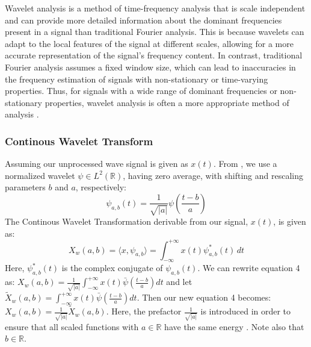 \documentclass{article}
\begin{document}
Wavelet analysis is a method of time-frequency analysis that is scale independent and can provide more detailed information about the dominant frequencies present in a signal than traditional Fourier analysis. This is because wavelets can adapt to the local features of the signal at different scales, allowing for a more accurate representation of the signal's frequency content. In contrast, traditional Fourier analysis assumes a fixed window size, which can lead to inaccuracies in the frequency estimation of signals with non-stationary or time-varying properties. Thus, for signals with a wide range of dominant frequencies or non-stationary properties, wavelet analysis is often a more appropriate method of analysis \cite{APracticalGuidetoWaveletAnalysis}.

\subsubsection{Continous Wavelet Transform}
Assuming our unprocessed wave signal is given as $x(t)$. From \cite{mertins1999signal}\cite{pereyra2012harmonic}, we use a normalized wavelet $\psi \in L^2(\mathbb{R})$, having zero average, with shifting and rescaling parameters $b$ and $a$, respectively:
\begin{equation} 
\psi_{a,b}(t) = \frac{1}{\sqrt{|a|}} \psi\left(\frac{t-b}{a}\right)
\end{equation}
The Continous Wavelet Transformation derivable from our signal, $x(t)$, is given as:
\begin{equation} 
X_{w}(a,b) = \langle x, \psi_{a,b} \rangle =\int_{-\infty}^{+\infty} x(t) \psi_{a,b}^{*}(t) \, dt
\end{equation}
Here, $\psi_{a,b}^{*}(t)$ is the complex conjugate of $\psi_{a,b}(t)$. We can rewrite equation 4 as: $X_{w}(a,b) = \frac{1}{\sqrt{|a|}}\int_{-\infty}^{+\infty} x(t) \bar{\psi}\left(\frac{t-b}{a}\right) dt$ and let $\tilde{X}_{w}(a,b)=\int_{-\infty}^{+\infty} x(t) \bar{\psi}\left(\frac{t-b}{a}\right) dt$. Then our new equation 4 becomes: $X_{w}(a,b)=\frac{1}{\sqrt{|a|}}\tilde{X}_{w}(a,b)$. 
Here, the prefactor $\frac{1}{\sqrt{|a|}}$ is introduced in order to ensure that all scaled functions with $a\in\mathbb{R}$ have the same energy \cite{mertins1999signal}\cite{Roy_2022}\cite{APracticalGuidetoWaveletAnalysis}. Note also that $b\in\mathbb{R}$.
\end{document}
